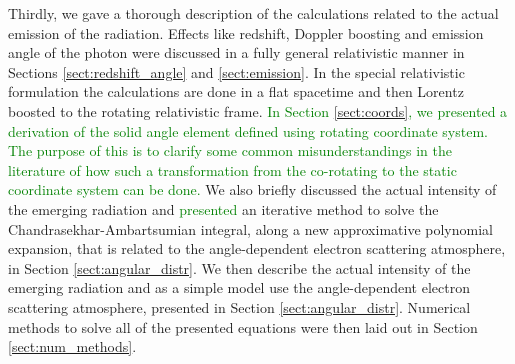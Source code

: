 \documentclass{aa}
\newcommand{\refe}[1]{\textcolor{green}{{#1}}}
\newcommand{\refedel}[1]{}
\newcommand{\sch}{Schwarzschild }
\newcommand{\lgamma}{\gamma_{\text{L}}}
\begin{document}
Thirdly, we gave a thorough description of the calculations related to the actual emission of the radiation.
Effects like redshift, Doppler boosting and emission angle of the photon were discussed in a fully general relativistic manner in Sections \ref{sect:redshift_angle} and \ref{sect:emission}. 
\refedel{,hence also verifying the previous ad-hoc special relativistic formulations}%
In the special relativistic formulation \citep[see e.g.,][]{PB06} the calculations are done in a flat spacetime and then Lorentz boosted to the rotating relativistic frame.
\refe{In Section \ref{sect:coords}, we presented a derivation of the solid angle element defined using rotating coordinate system.}
\refe{The purpose of this is to clarify some common misunderstandings in the literature of how such a transformation from the co-rotating to the static coordinate system can be done.}
We also briefly discussed the actual intensity of the emerging radiation and \refe{presented} an iterative method to solve the Chandrasekhar-Ambartsumian integral, along a new approximative polynomial expansion, that is related to the angle-dependent electron scattering atmosphere, in Section \ref{sect:angular_distr}.
We then describe the actual intensity of the emerging radiation and as a simple model use the angle-dependent electron scattering atmosphere, presented in Section \ref{sect:angular_distr}.
Numerical methods to solve all of the presented equations were then laid out in Section \ref{sect:num_methods}.
\end{document}
